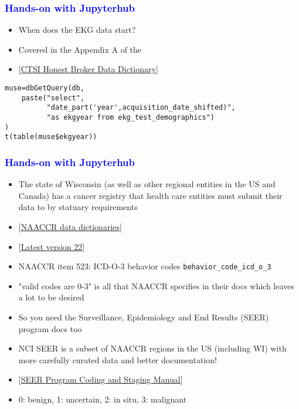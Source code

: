 \documentclass[11pt,pdftex,dvipsnames,usenames]{beamer}
\begin{document}
\begin{frame}[fragile]\frametitle{\bf\textcolor{blue}{Hands-on with Jupyterhub}}
\begin{itemize}
\item When does the EKG data start?
\item Covered in the Appendix A of the 
\item \textcolor{PineGreen}{[\href{https://ctri.mcw.edu/wp-content/uploads/CTSI-Honest-Broker-Data-Dictionary.pdf}{CTSI Honest Broker Data Dictionary}]}
\end{itemize}
\begin{verbatim}
muse=dbGetQuery(db, 
    paste("select",
          "date_part('year',acquisition_date_shifted)",
          "as ekgyear from ekg_test_demographics")
)
t(table(muse$ekgyear))
\end{verbatim}
\end{frame}

\begin{frame}[fragile]\frametitle{\bf\textcolor{blue}{Hands-on with Jupyterhub}}
\begin{itemize}
\item The state of Wisconsin (as well as other regional entities in the US
and Canada) has a cancer registry that health care entities must
submit their data to by statuary requirements
\item \textcolor{PineGreen}{[\href{https://www.naaccr.org/data-standards-data-dictionary}
{NAACCR data dictionaries}]}
\item 
\textcolor{PineGreen}{[\href{http://datadictionary.naaccr.org/default.aspx?c=10&Version=22}
{Latest version 22}]}
\item NAACCR item 523: ICD-O-3 behavior codes \texttt{behavior\_code\_icd\_o\_3}
\item "valid codes are 0-3" is all that NAACCR specifies in their docs which leaves a lot to be desired
\item So you need the Surveillance, Epidemiology
and End Results (SEER) program docs too 
\item NCI SEER is a subset of NAACCR
regions in the US (including WI) with more carefully curated data
and better documentation!
\item \textcolor{PineGreen}{[\href{https://seer.cancer.gov/manuals/2022/SPCSM_2022_MainDoc.pdf}
{SEER Program Coding and Staging Manual}]}
\item 0: benign, 1: uncertain, 2: in situ, 3: malignant
\end{itemize}
\end{frame}
\end{document}
